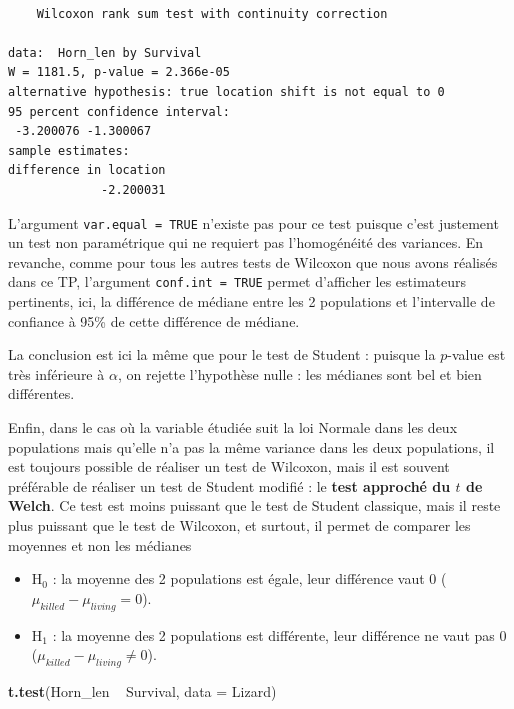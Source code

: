 \documentclass[a4paperpaper,]{article}
\newenvironment{Shaded}{\begin{snugshade}}{\end{snugshade}}
\newcommand{\DataTypeTok}[1]{\textcolor[rgb]{0.00,0.34,0.68}{#1}}
\newcommand{\KeywordTok}[1]{\textcolor[rgb]{0.12,0.11,0.11}{\textbf{#1}}}
\newcommand{\NormalTok}[1]{\textcolor[rgb]{0.12,0.11,0.11}{#1}}
\newcommand{\OperatorTok}[1]{\textcolor[rgb]{0.12,0.11,0.11}{#1}}
\newcommand{\StringTok}[1]{\textcolor[rgb]{0.75,0.01,0.01}{#1}}
\providecommand{\tightlist}{%
  \setlength{\itemsep}{0pt}\setlength{\parskip}{0pt}}
\begin{document}
\begin{verbatim}

    Wilcoxon rank sum test with continuity correction

data:  Horn_len by Survival
W = 1181.5, p-value = 2.366e-05
alternative hypothesis: true location shift is not equal to 0
95 percent confidence interval:
 -3.200076 -1.300067
sample estimates:
difference in location 
             -2.200031 
\end{verbatim}

L'argument \texttt{var.equal\ =\ TRUE} n'existe pas pour ce test puisque c'est justement un test non paramétrique qui ne requiert pas l'homogénéité des variances. En revanche, comme pour tous les autres tests de Wilcoxon que nous avons réalisés dans ce TP, l'argument \texttt{conf.int\ =\ TRUE} permet d'afficher les estimateurs pertinents, ici, la différence de médiane entre les 2 populations et l'intervalle de confiance à 95\% de cette différence de médiane.

La conclusion est ici la même que pour le test de Student : puisque la \(p\)-value est très inférieure à \(\alpha\), on rejette l'hypothèse nulle : les médianes sont bel et bien différentes.

Enfin, dans le cas où la variable étudiée suit la loi Normale dans les deux populations mais qu'elle n'a pas la même variance dans les deux populations, il est toujours possible de réaliser un test de Wilcoxon, mais il est souvent préférable de réaliser un test de Student modifié : le \textbf{test approché du \(t\) de Welch}. Ce test est moins puissant que le test de Student classique, mais il reste plus puissant que le test de Wilcoxon, et surtout, il permet de comparer les moyennes et non les médianes

\begin{itemize}
\tightlist
\item
  H\(_0\) : la moyenne des 2 populations est égale, leur différence vaut 0 (\(\mu_{killed}-\mu_{living} = 0\)).
\item
  H\(_1\) : la moyenne des 2 populations est différente, leur différence ne vaut pas 0 (\(\mu_{killed}-\mu_{living} \neq 0\)).
\end{itemize}

\begin{Shaded}
\begin{Highlighting}[]
\KeywordTok{t.test}\NormalTok{(Horn_len }\OperatorTok{~}\StringTok{ }\NormalTok{Survival, }\DataTypeTok{data =}\NormalTok{ Lizard)}
\end{Highlighting}
\end{Shaded}
\end{document}
